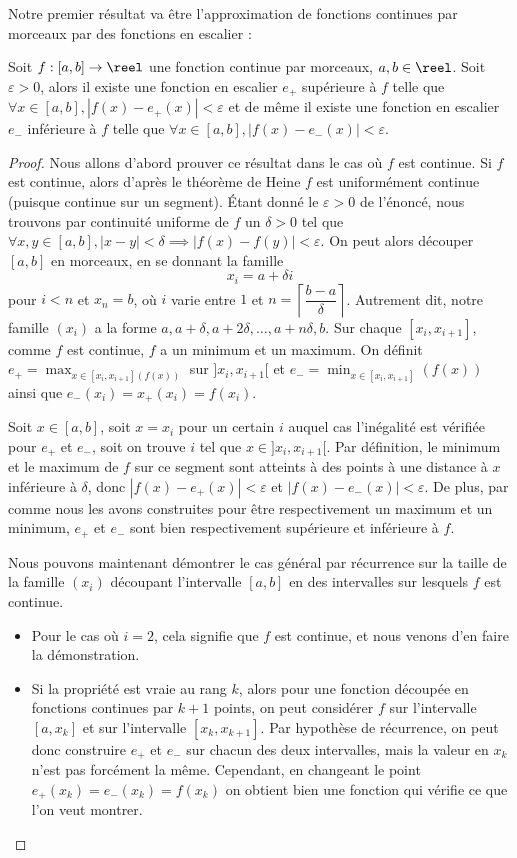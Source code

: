 Notre premier résultat va être l'approximation de fonctions continues par morceaux par des fonctions en escalier :

\begin{prop}
    Soit $f : [a,b]\to\reel$ une fonction continue par morceaux, $a,b\in\reel$. Soit $\varepsilon > 0$, alors il existe une fonction en escalier $e_+$ supérieure à $f$ telle que $\forall x\in[a,b], |f(x)-e_+(x)| < \varepsilon$ et de même il existe une fonction en escalier $e_-$ inférieure à $f$ telle que $\forall x \in[a,b], |f(x)-e_-(x)| < \varepsilon$. 
\end{prop}

\begin{proof}
    Nous allons d'abord prouver ce résultat dans le cas où $f$ est continue. Si $f$ est continue, alors d'après le théorème de Heine $f$ est uniformément continue (puisque continue sur un segment). \'Etant donné le $\varepsilon > 0$ de l'énoncé, nous trouvons par continuité uniforme de $f$ un $\delta > 0$ tel que $\forall x,y \in [a,b], |x-y| < \delta\implies |f(x)-f(y)| < \varepsilon$. On peut alors découper $[a,b]$ en morceaux, en se donnant la famille $$x_i = a+\delta i$$ pour $i < n$ et $x_n = b$, où $i$ varie entre $1$ et $ n = \left\lceil\dfrac{b-a}{\delta}\right\rceil$. Autrement dit, notre famille $(x_i)$ a la forme $a,a+\delta,a+2\delta,\ldots, a+n\delta,b$. Sur chaque $[x_i,x_{i+1}]$, comme $f$ est continue, $f$ a un minimum et un maximum. On définit $e_+ = \displaystyle\max_{x\in[x_i,x_{i+1}](f(x))}$ sur $]x_i,x_{i+1}[$ et $e_- = \displaystyle\min_{x\in[x_i,x_{i+1}]}(f(x))$ ainsi que $e_-(x_i)=x_+(x_i)=f(x_i)$.

    Soit $x\in [a,b]$, soit $x = x_i$ pour un certain $i$ auquel cas l'inégalité est vérifiée pour $e_+$ et $e_-$, soit on trouve $i$ tel que $x\in]x_i,x_{i+1}[$. Par définition, le minimum et le maximum de $f$ sur ce segment sont atteints à des points à une distance à $x$ inférieure à $\delta$, donc $|f(x)-e_+(x)|  < \varepsilon$ et $|f(x)-e_-(x)| < \varepsilon$. De plus, par comme nous les avons construites pour être respectivement un maximum et un minimum, $e_+$ et $e_-$ sont bien respectivement supérieure et inférieure à $f$.

    Nous pouvons maintenant démontrer le cas général par récurrence sur la taille de la famille $(x_i)$ découpant l'intervalle $[a,b]$ en des intervalles sur lesquels $f$ est continue.
    \begin{itemize}[label=$\bullet$]
        \item Pour le cas où $i=2$, cela signifie que $f$ est continue, et nous venons d'en faire la démonstration.
        \item Si la propriété est vraie au rang $k$, alors pour une fonction découpée en fonctions continues par $k+1$ points, on peut considérer $f$ sur l'intervalle $[a,x_k]$ et sur l'intervalle $[x_k,x_{k+1}]$. Par hypothèse de récurrence, on peut donc construire $e_+$ et $e_-$ sur chacun des deux intervalles, mais la valeur en $x_k$ n'est pas forcément la même. Cependant, en changeant le point $e_+(x_k)=e_-(x_k)=f(x_k)$ on obtient bien une fonction qui vérifie ce que l'on veut montrer.
    \end{itemize}


\end{proof}
